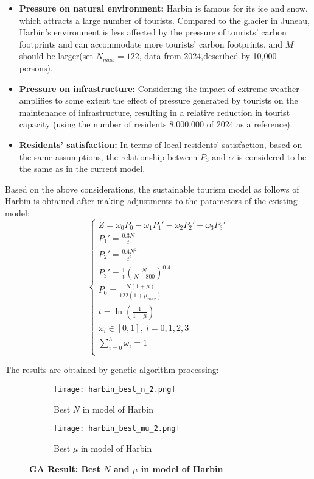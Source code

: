 \documentclass{mcmthesis}
\begin{document}
\begin{itemize}
  \item \textbf{Pressure on natural environment:} {Harbin is famous for its ice and snow, which attracts a large number of tourists. Compared to the glacier in Juneau, Harbin's environment is less affected by the pressure of tourists' carbon footprints and can accommodate more tourists' carbon footprints, and $M$ should be larger(set $N_{max}=122$, data from 2024,described by 10,000 persons).}
  \item \textbf{Pressure on infrastructure:} {Considering the impact of extreme weather amplifies to some extent the effect of pressure generated by tourists on the maintenance of infrastructure, resulting in a relative reduction in tourist capacity (using the number of residents 8,000,000 of 2024 as a reference).}
  \item \textbf{Residents' satisfaction:} {In terms of local residents' satisfaction, based on the same assumptions, the relationship between $P_3$ and $\alpha$ is considered to be the same as in the current model.}
\end{itemize}
{Based on the above considerations, the sustainable tourism model as follows of Harbin is obtained after making adjustments to the parameters of the existing model:}
\begin{equation}
  \begin{cases}
  Z=\omega_0 P_0-\omega_1 P_1'-\omega_2 P_2'-\omega_3 P_3'\\
  P_1'=\frac{0.3N}{t} \\
  P_2'=\frac{0.4N^2}{t^2} \\
  P_3'=\frac{1}{t}\left(\frac{N}{N+800}\right)^{0.4} \\
  P_0=\frac{N (1+\mu)}{122 (1+\mu_{max})} \\
  t = \ln\left(\frac{1}{1 - \mu}\right) \\
  \omega_i \in [0,1], \ i = 0,1,2,3 \\
  \sum\limits_{i=0}^3 \omega_i = 1 \\
  \end{cases}
  \end{equation}

{The results are obtained by genetic algorithm processing:}

\begin{figure}[H]
  \centering
  \begin{subfigure}[b]{0.4\textwidth}
      \texttt{[image: harbin\_best\_n\_2.png]}
      \caption{Best $N$ in model of Harbin}
      \label{HRBn}
  \end{subfigure}
  \hfill
  \begin{subfigure}[b]{0.4\textwidth}
      \texttt{[image: harbin\_best\_mu\_2.png]}
      \caption{Best $\mu$ in model of Harbin}
      \label{HRBmu}
  \end{subfigure}
  \caption{\textbf{GA Result: Best $N$ and $\mu$ in model of Harbin}}
  \label{fig:HRB}
\end{figure}
\end{document}
